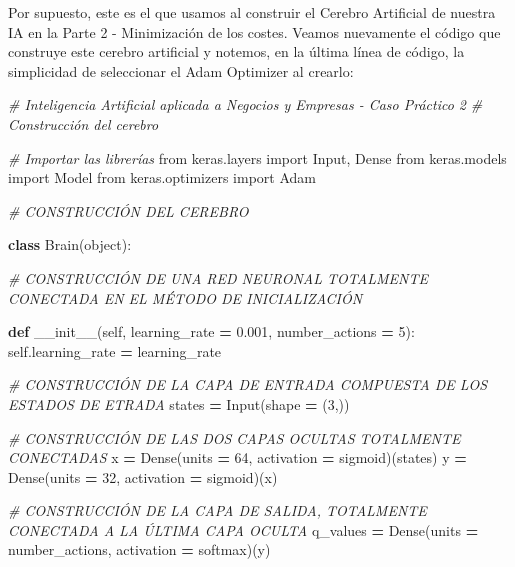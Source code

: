 \documentclass[
]{book}
\newenvironment{Shaded}{\begin{snugshade}}{\end{snugshade}}
\newcommand{\BuiltInTok}[1]{#1}
\newcommand{\CommentTok}[1]{\textcolor[rgb]{0.56,0.35,0.01}{\textit{#1}}}
\newcommand{\DecValTok}[1]{\textcolor[rgb]{0.00,0.00,0.81}{#1}}
\newcommand{\FloatTok}[1]{\textcolor[rgb]{0.00,0.00,0.81}{#1}}
\newcommand{\FunctionTok}[1]{\textcolor[rgb]{0.00,0.00,0.00}{#1}}
\newcommand{\ImportTok}[1]{#1}
\newcommand{\KeywordTok}[1]{\textcolor[rgb]{0.13,0.29,0.53}{\textbf{#1}}}
\newcommand{\NormalTok}[1]{#1}
\newcommand{\OperatorTok}[1]{\textcolor[rgb]{0.81,0.36,0.00}{\textbf{#1}}}
\newcommand{\StringTok}[1]{\textcolor[rgb]{0.31,0.60,0.02}{#1}}
\newcommand{\VariableTok}[1]{\textcolor[rgb]{0.00,0.00,0.00}{#1}}
\begin{document}
Por supuesto, este es el que usamos al construir el Cerebro Artificial de nuestra IA en la Parte 2 - Minimización de los costes. Veamos nuevamente el código que construye este cerebro artificial y notemos, en la última línea de código, la simplicidad de seleccionar el Adam Optimizer al crearlo:

\begin{Shaded}
\begin{Highlighting}[]
\CommentTok{\# Inteligencia Artificial aplicada a Negocios y Empresas {-} Caso Práctico 2}
\CommentTok{\# Construcción del cerebro}

\CommentTok{\# Importar las librerías}
\ImportTok{from}\NormalTok{ keras.layers }\ImportTok{import}\NormalTok{ Input, Dense}
\ImportTok{from}\NormalTok{ keras.models }\ImportTok{import}\NormalTok{ Model}
\ImportTok{from}\NormalTok{ keras.optimizers }\ImportTok{import}\NormalTok{ Adam}

\CommentTok{\# CONSTRUCCIÓN DEL CEREBRO}

\KeywordTok{class}\NormalTok{ Brain(}\BuiltInTok{object}\NormalTok{):}
    
    \CommentTok{\# CONSTRUCCIÓN DE UNA RED NEURONAL TOTALMENTE CONECTADA EN EL MÉTODO DE INICIALIZACIÓN}
    
    \KeywordTok{def} \FunctionTok{\_\_init\_\_}\NormalTok{(}\VariableTok{self}\NormalTok{, learning\_rate }\OperatorTok{=} \FloatTok{0.001}\NormalTok{, number\_actions }\OperatorTok{=} \DecValTok{5}\NormalTok{):}
        \VariableTok{self}\NormalTok{.learning\_rate }\OperatorTok{=}\NormalTok{ learning\_rate}
        
        \CommentTok{\# CONSTRUCCIÓN DE LA CAPA DE ENTRADA COMPUESTA DE LOS ESTADOS DE ETRADA}
\NormalTok{        states }\OperatorTok{=}\NormalTok{ Input(shape }\OperatorTok{=}\NormalTok{ (}\DecValTok{3}\NormalTok{,))}
        
        \CommentTok{\# CONSTRUCCIÓN DE LAS DOS CAPAS OCULTAS TOTALMENTE CONECTADAS}
\NormalTok{        x }\OperatorTok{=}\NormalTok{ Dense(units }\OperatorTok{=} \DecValTok{64}\NormalTok{, activation }\OperatorTok{=} \StringTok{\textquotesingle{}sigmoid\textquotesingle{}}\NormalTok{)(states)}
\NormalTok{        y }\OperatorTok{=}\NormalTok{ Dense(units }\OperatorTok{=} \DecValTok{32}\NormalTok{, activation }\OperatorTok{=} \StringTok{\textquotesingle{}sigmoid\textquotesingle{}}\NormalTok{)(x)}
        
        \CommentTok{\# CONSTRUCCIÓN DE LA CAPA DE SALIDA, TOTALMENTE CONECTADA A LA ÚLTIMA CAPA OCULTA}
\NormalTok{        q\_values }\OperatorTok{=}\NormalTok{ Dense(units }\OperatorTok{=}\NormalTok{ number\_actions, activation }\OperatorTok{=} \StringTok{\textquotesingle{}softmax\textquotesingle{}}\NormalTok{)(y)}
        

\end{Highlighting}
\end{Shaded}
\end{document}
